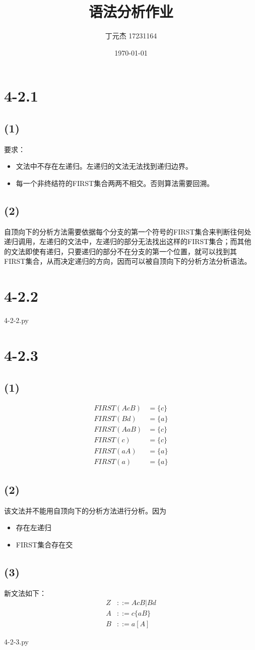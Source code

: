 \documentclass[UTF8]{ctexart}
\title{语法分析作业}
\author{丁元杰 17231164}
\date{\today}
\begin{document}
\maketitle

\section*{4-2.1}
\subsection*{(1)}
要求：
\begin{itemize}
    \item 文法中不存在左递归。左递归的文法无法找到递归边界。
    \item 每一个非终结符的FIRST集合两两不相交。否则算法需要回溯。
\end{itemize}

\subsection*{(2)}
自顶向下的分析方法需要依据每个分支的第一个符号的FIRST集合来判断往何处递归调用，左递归的文法中，左递归的部分无法找出这样的FIRST集合；而其他的文法即使有递归，只要递归的部分不在分支的第一个位置，就可以找到其FIRST集合，从而决定递归的方向，因而可以被自顶向下的分析方法分析语法。

\section*{4-2.2}
 {4-2-2.py}

\section*{4-2.3}
\subsection*{(1)}
\begin{align*}
    FIRST(AcB) & = \{c\} \\
    FIRST(Bd) & = \{a\} \\
    FIRST(AaB) &= \{c\} \\
    FIRST(c) &= \{c\} \\
    FIRST(aA) &= \{a\} \\
    FIRST(a) &= \{a\}
\end{align*}

\subsection*{(2)}
该文法并不能用自顶向下的分析方法进行分析。因为
\begin{itemize}
    \item 存在左递归
    \item FIRST集合存在交
\end{itemize}

\subsection*{(3)}
新文法如下：
\begin{align*}
    Z&::=AcB \big| Bd\\
    A&::=c\{aB\}\\
    B&::=a[A]
\end{align*}

 {4-2-3.py}
\end{document}
